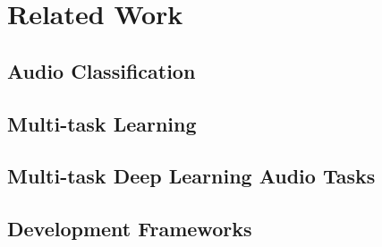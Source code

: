 \chapter{Related Work}

\section{Audio Classification}

\section{Multi-task Learning}

\section{Multi-task Deep Learning Audio Tasks}

\section{Development Frameworks}